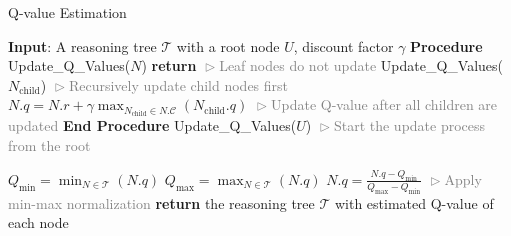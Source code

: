 \begin{algorithm}[tb]
\caption{Q-value Estimation}\label{algo:estimate_q}
\begin{algorithmic}
\STATE \textbf{Input}: A reasoning tree $\mathcal{T}$ with a root node $U$, discount factor $\gamma$
\STATE \STATE \textbf{Procedure} \hspace{5pt}Update\_Q\_Values($N$)
    \STATE \textbf{return}  
        \hfill \textcolor{gray}{$\vartriangleright$Leaf nodes do not update}
    \ENDIF
        \STATE Update\_Q\_Values($N_{\text{child}}$)
        \hfill \textcolor{gray}{$\vartriangleright$Recursively update child nodes first}
    \ENDFOR
    \STATE $N.q = N.r + \gamma \max_{N_\text{child} \in N.\mathcal{C}}(N_\text{child}.q)$ 
    \hfill \textcolor{gray}{$\vartriangleright$Update Q-value after all children are updated}
\STATE \textbf{End Procedure}
\STATE \STATE Update\_Q\_Values($U$) 
\hfill \textcolor{gray}{$\vartriangleright$Start the update process from the root}

\STATE $Q_{\text{min}} = \min_{N \in \mathcal{T}}(N.q)$ 
\STATE $Q_{\text{max}} = \max_{N \in \mathcal{T}}(N.q)$ 
    \STATE $N.q = \frac{N.q - Q_{\text{min}}}{Q_{\text{max}} - Q_{\text{min}}}$ 
    \hfill \textcolor{gray}{$\vartriangleright$Apply min-max normalization}
\ENDFOR
\STATE \textbf{return} the reasoning tree $\mathcal{T}$ with estimated Q-value of each node

\end{algorithmic}
\end{algorithm}
